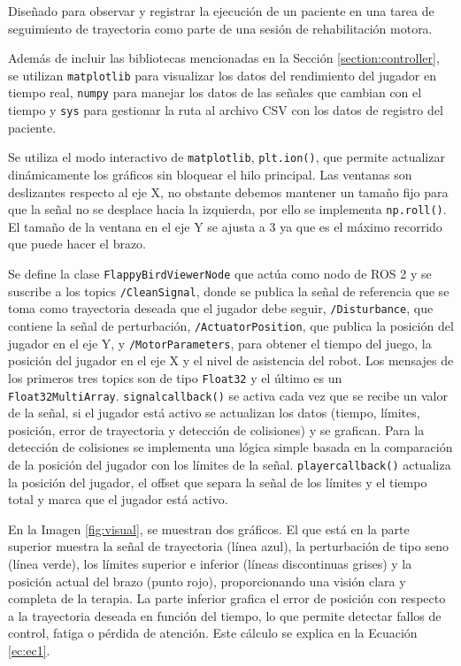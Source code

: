 Diseñado para observar y registrar la ejecución de un paciente en una tarea de seguimiento de trayectoria como parte de una sesión de rehabilitación motora.

Además de incluir las bibliotecas mencionadas en la Sección \ref{section:controller}, se utilizan \verb|matplotlib| para visualizar los datos del rendimiento del jugador en tiempo real, \verb|numpy| para manejar los datos de las señales que cambian con el tiempo y \verb|sys| para gestionar la ruta al archivo CSV con los datos de registro del paciente.

Se utiliza el modo interactivo de \verb|matplotlib|, \verb|plt.ion()|, que permite actualizar dinámicamente los gráficos sin bloquear el hilo principal.
Las ventanas son deslizantes respecto al eje X, no obstante debemos mantener un tamaño fijo para que la señal no se desplace hacia la izquierda, por ello se implementa \verb|np.roll()|.
El tamaño de la ventana en el eje Y se ajusta a $3$ ya que es el máximo recorrido que puede hacer el brazo.

Se define la clase \verb|FlappyBirdViewerNode| que actúa como nodo de ROS 2 y se suscribe a los topics \verb|/CleanSignal|, donde se publica la señal de referencia que se toma como trayectoria deseada que el jugador debe seguir, \verb|/Disturbance|, que contiene la señal de perturbación, \verb|/ActuatorPosition|, que publica la posición del jugador en el eje Y, y \verb|/MotorParameters|, para obtener el tiempo del juego, la posición del jugador en el eje X y el nivel de asistencia del robot.
Los mensajes de los primeros tres topics son de tipo \verb|Float32| y el último es un \verb|Float32MultiArray|.
\verb|signalcallback()| se activa cada vez que se recibe un valor de la señal, si el jugador está activo se actualizan los datos (tiempo, límites, posición, error de trayectoria y detección de colisiones) y se grafican.
Para la detección de colisiones se implementa una lógica simple basada en la comparación de la posición del jugador con los límites de la señal.
\verb|playercallback()| actualiza la posición del jugador, el offset que separa la señal de los límites y el tiempo total y marca que el jugador está activo.

En la Imagen \ref{fig:visual}, se muestran dos gráficos.
El que está en la parte superior muestra la señal de trayectoria (línea azul), la perturbación de tipo seno (línea verde), los límites superior e inferior (líneas discontinuas grises) y la posición actual del brazo (punto rojo), proporcionando una visión clara y completa de la terapia.
La parte inferior grafica el error de posición con respecto a la trayectoria deseada en función del tiempo, lo que permite detectar fallos de control, fatiga o pérdida de atención.
Este cálculo se explica en la Ecuación \ref{ec:ec1}.

